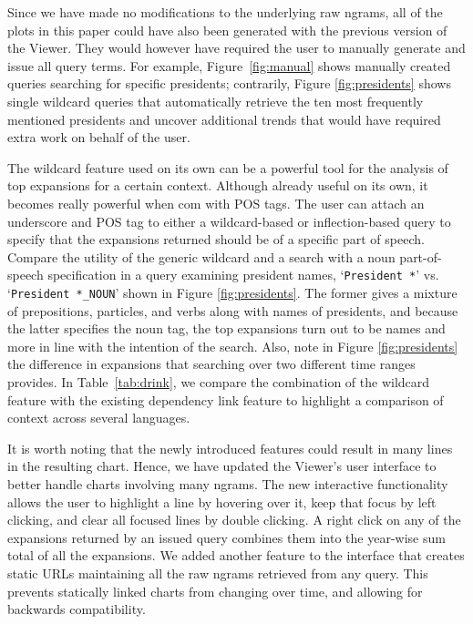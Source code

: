 \documentclass[11pt,a4paper]{article}
\newcommand{\query}[1]{\texttt{#1}}
\begin{document}
Since we have made no modifications to the underlying raw ngrams, all of the plots in this paper could have also been generated with the previous version of the Viewer. They would however have required the user to manually generate and issue all query terms. For example, Figure~\ref{fig:manual} shows manually created queries searching for specific presidents; contrarily, Figure \ref{fig:presidents} shows single wildcard queries that automatically retrieve the ten most frequently mentioned presidents and uncover additional trends that would have required extra work on behalf of the user.

The wildcard feature used on its own can be a powerful tool for the analysis of top expansions for a certain context.  Although already useful on its own, it becomes really powerful when com with POS tags. The user can attach an underscore and POS tag to either a wildcard-based or inflection-based query to specify that the expansions returned should be of a specific part of speech. Compare the utility of the generic wildcard and a search with a noun part-of-speech specification in a query examining president names, `\query{President *}' vs. `\query{President *\_NOUN}' shown in Figure \ref{fig:presidents}. The former gives a mixture of prepositions, particles, and verbs along with names of presidents, and because the latter specifies the noun tag, the top expansions turn out to be names and more in line with the intention of the search. Also, note in Figure \ref{fig:presidents} the difference in expansions that searching over two different time ranges provides. In Table~\ref{tab:drink}, we compare the combination of the wildcard feature with the existing dependency link feature to highlight a comparison of context across several languages.

It is worth noting that the newly introduced features could result in many lines in the resulting chart. Hence, we have updated the Viewer's user interface to better handle charts involving many ngrams. The new interactive functionality allows the user to highlight a line by hovering over it, keep that focus by left clicking, and clear all focused lines by double clicking. A right click on any of the expansions returned by an issued query combines them into the year-wise sum total of all the expansions. We added another feature to the interface that creates static URLs maintaining all the raw ngrams retrieved from any query. This prevents statically linked charts from changing over time, and allowing for backwards compatibility.
\end{document}
